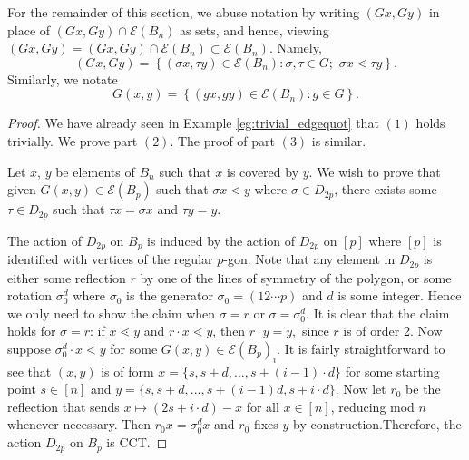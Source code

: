 \documentclass[smallextended, envcountsame, numbook]{svjour3}
\numberwithin{equation}{section}
\begin{document}
For the remainder of this section, we abuse notation by writing $(Gx, Gy)$ in place of $(Gx, Gy) \cap  \mathcal E(B_n)$ as sets, and hence, viewing $(Gx, Gy) = (Gx, Gy) \cap  \mathcal E(B_n)\subset  \mathcal E(B_n)$. Namely, $$(Gx, Gy) = \left\{ (\sigma x, \tau y) \in  \mathcal E (B_n) : \sigma, \tau \in G; \, \, \sigma x \lessdot \tau y  \right\}.$$ Similarly, we notate $$G(x, y) = \left\{ (gx , g y) \in  \mathcal E (B_n) \colon g \in G \right\}.$$

\building*

\begin{proof}
We have already seen in Example \ref{eg:trivial_edgequot} that $(1)$ holds trivially. We prove part $(2)$. The proof of part $(3)$ is similar. 

Let $x$, $y$ be elements of $B_n$ such that $x$ is covered by $y$.  We wish to prove that given $G(x, y) \in \mathcal E (B_p)$ such that $\sigma x \lessdot y$ where $\sigma \in D_{2p}$, there exists some $\tau \in D_{2p}$ such that $\tau x = \sigma x$ and $\tau y = y$. 

The action of $D_{2p}$ on $B_p$ is induced by the action of $D_{2p}$ on $[p]$ where $[p]$ is identified with vertices of the regular $p$-gon. Note that any element in $D_{2p}$ is either some reflection $r$ by one of the lines of symmetry of the polygon, or some rotation $\sigma_0^{d} $ where $\sigma_0$ is the generator $\sigma_0 = (12 \cdots p)$ and $d$ is some integer. Hence we only need to show the claim when $\sigma = r$ or $\sigma = \sigma_0^d$. It is clear that the claim holds for $\sigma = r$: if $x \lessdot y$ and $r \cdot x \lessdot y$, then $r \cdot y = y,$ since $r$ is of order 2. Now suppose $\sigma_0^d \cdot x \lessdot y$ for some $G(x,y) \in \mathcal E(B_p)_i$.  It is fairly straightforward to see that $(x, y)$ is of form $x = \{s, s+d, ..., s+(i-1)\cdot d\}$ for some starting point $s \in [n]$ and $y = \{s, s+d, ..., s+(i-1)d, s + i \cdot d\}$. Now let $r_0$ be the reflection that sends $x \mapsto (2s+ i \cdot d)-x$ for all $x \in [n]$, reducing mod $n$ whenever necessary. Then $r_0 x = \sigma_0^d x$ and $r_0$ fixes $y$ by construction.Therefore, the action $D_{2p}$ on $B_p$ is CCT. 
\end{proof}
\end{document}
